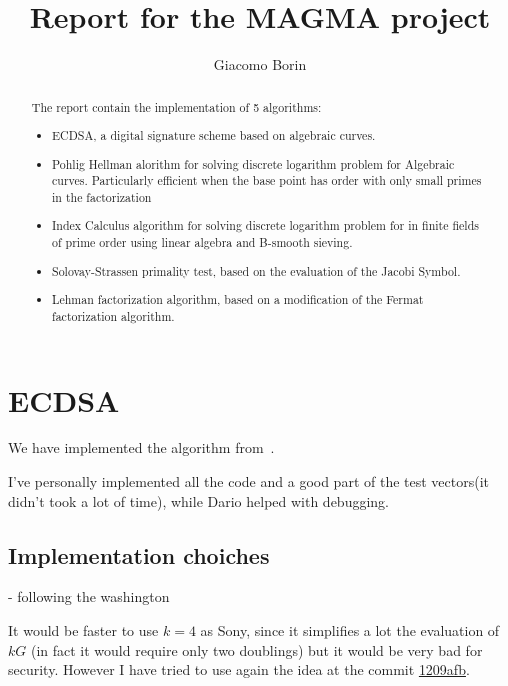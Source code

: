 \documentclass{article}
\title{Report for the MAGMA project}
\author{Giacomo Borin}
\theoremstyle{plain}
\theoremstyle{remark}
\theoremstyle{definition}
\begin{document}
\maketitle

\begin{abstract}
	The report contain the implementation of 5 algorithms:
	\begin{itemize}
		\item ECDSA, a digital signature scheme based on algebraic curves.
		\item Pohlig Hellman alorithm for solving discrete logarithm problem for Algebraic curves. Particularly efficient when the base point has order with only small primes in the factorization
		\item Index Calculus algorithm for solving discrete logarithm problem for in finite fields of prime order using linear algebra and B-smooth sieving.
		\item Solovay-Strassen primality test, based on the evaluation of the Jacobi Symbol.
		\item Lehman factorization algorithm, based on a modification of the Fermat factorization algorithm.
	\end{itemize}

\end{abstract}


\section{ECDSA}

We have implemented the algorithm from~\cite[Section 6.6]{washington}.




I've personally implemented all the code and a good part of the test vectors(it didn't took a lot of time), while Dario helped with debugging.

\subsection{Implementation choiches}

- following the washington

It would be faster to use $k = 4$ as Sony, since it simplifies a lot the evaluation of $kG$ (in fact it would require only two doublings) but it would be very bad for security. However I have tried to use again the idea at the commit \href{https://github.com/giacomoborin/project2_MAGMA/commit/1209afbbb3bed86d26ebf342bf6f43453de3e795}{1209afb}.
\end{document}
